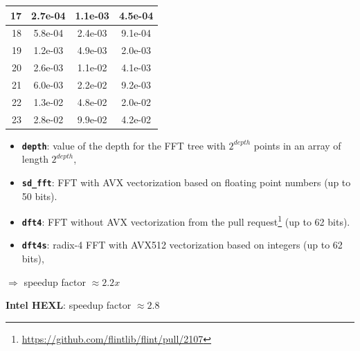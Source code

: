 \documentclass[10pt]{beamer}
\begin{document}
\begin{frame}
\begin{multicols}{2}
\begin{center}
{\begin{tabular}{|r|*{3}{c|}}
                \hline
                \cellcolor{myGray} 17 & 2.7e-04 & 1.1e-03 & 4.5e-04 \\
                \hline
                \cellcolor{myGray} 18 & 5.8e-04 & 2.4e-03 & 9.1e-04 \\
                \hline
                \cellcolor{myGray} 19 & 1.2e-03 & 4.9e-03 & 2.0e-03 \\
                \hline
                \cellcolor{myGray} 20 & 2.6e-03 & 1.1e-02 & 4.1e-03 \\
                \hline
                \cellcolor{myGray} 21 & 6.0e-03 & 2.2e-02 & 9.2e-03 \\
                \hline
                \cellcolor{myGray} 22 & 1.3e-02 & 4.8e-02 & 2.0e-02 \\
                \hline
                \cellcolor{myGray} 23 & 2.8e-02 & 9.9e-02 & 4.2e-02 \\
                \hline
            \end{tabular}
            }
        \end{center}
    \columnbreak

    \begin{itemize}
        \item \textbf{\texttt{depth}}: value of the depth for the FFT tree with $2^{depth}$ points
        in an array of length $2^{depth}$,
        \item \textbf{\texttt{sd\_fft}}: FFT with AVX vectorization based on floating point numbers (up to 50 bits).
        \item \textbf{\texttt{dft4}}: FFT without AVX vectorization from the pull request\footnote{\url{https://github.com/flintlib/flint/pull/2107}} (up to 62 bits).    
        \item \textbf{\texttt{dft4s}}: radix-4 FFT with AVX512 vectorization based on integers (up to 62 bits),
    \end{itemize}
    $\Longrightarrow$ speedup factor $\approx 2.2x$

    \medskip
    \textbf{Intel HEXL}: speedup factor $\approx 2.8$
    \end{multicols}
\end{frame}
\end{document}
